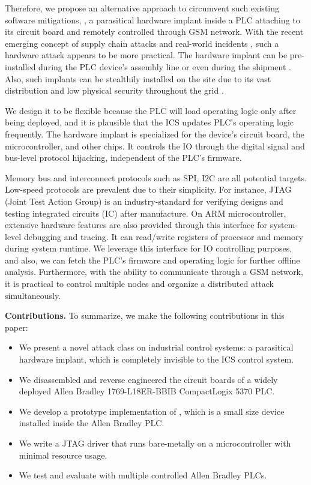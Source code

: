 
Therefore, we propose an alternative approach to circumvent such existing software mitigations, \name, a parasitical hardware implant inside a PLC attaching to its circuit board and remotely controlled through GSM network.  With the recent emerging concept of supply chain attacks and real-world incidents \cite{oxfordsolarwinds}, such a hardware attack appears to be more practical. The hardware implant can be pre-installed during the PLC device's assembly line or even during the shipment \cite{robertson2018big}. Also, such implants can be stealthily installed on the site due to its vast distribution and low physical security throughout the grid \cite{Loopholes2020}.


We design it to be flexible because the PLC will load operating logic only after being deployed, and it is plausible that the ICS updates PLC's operating logic frequently. The hardware implant is specialized for the device's circuit board, the microcontroller, and other chips.  It controls the IO through the digital signal and bus-level protocol hijacking, independent of the PLC's firmware.

Memory bus and interconnect protocols such as SPI, I2C are all potential targets. Low-speed protocols are prevalent due to their simplicity. For instance, JTAG (Joint Test Action Group) is an industry-standard for verifying designs and testing integrated circuits (IC) after manufacture. On ARM microcontroller, extensive hardware features are also provided through this interface for system-level debugging and tracing. It can read/write registers of processor and memory during system runtime. We leverage this interface for IO controlling purposes, and also, we can fetch the PLC's firmware and operating logic for further offline analysis. Furthermore, with the ability to communicate through a GSM network, it is practical to control multiple nodes and organize a distributed attack simultaneously.



\textbf{Contributions.} To summarize, we make the following contributions in this paper:
\begin{itemize}[leftmargin=*]
	\item We present a novel attack class on industrial control systems: a parasitical hardware implant, which is completely invisible to the ICS control system.
	\item We disassembled and reverse engineered the circuit boards of a widely deployed Allen Bradley 1769-L18ER-BBIB CompactLogix 5370 PLC. 
	\item We develop a prototype implementation of \name, which is a small size device installed inside the Allen Bradley PLC. 
	\item We write a JTAG driver that runs bare-metally on a microcontroller with minimal resource usage.
	\item We test and evaluate \name with multiple controlled Allen Bradley PLCs. 
\end{itemize}

